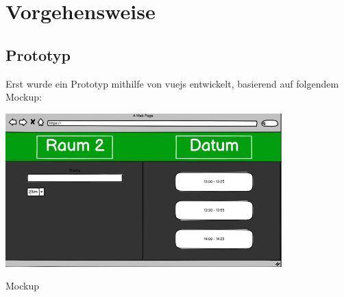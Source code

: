 
\pagebreak
\section{Vorgehensweise}
\subsection{Prototyp}
Erst wurde ein Prototyp mithilfe von vuejs entwickelt, basierend auf folgendem Mockup:
\par\vspace{1cm}
    \centering
    \includegraphics[width=0.8\textwidth]{Bilder/mockup}
    \caption{Mockup}
    \label{fig:Mockup}
